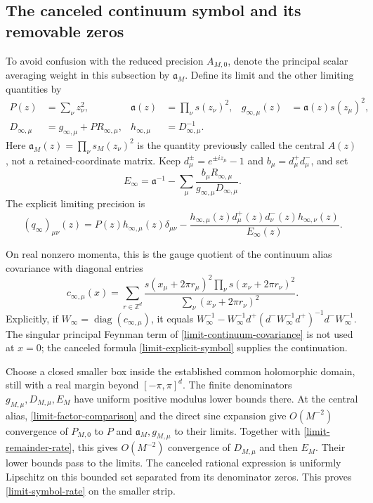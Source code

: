 \documentclass[11pt]{article}
\theoremstyle{remark}
\newcommand{\diag}{\operatorname{diag}}
\begin{document}
\subsection{The canceled continuum symbol and its removable zeros}

To avoid confusion with the reduced precision $A_{M,0}$, denote the
principal scalar averaging weight in this subsection by
$\mathfrak a_M$. Define its limit and the other limiting quantities by
\begin{align}
 P(z)&=\sum_\nu z_\nu^2,&
 \mathfrak a(z)&=\prod_\nu s(z_\nu)^2,&
 g_{\infty,\mu}(z)&=\mathfrak a(z)s(z_\mu)^2,
 \label{limit-central}\\
 D_{\infty,\mu}&=g_{\infty,\mu}+P R_{\infty,\mu},&
 h_{\infty,\mu}&=D_{\infty,\mu}^{-1}.&&
 \nonumber
\end{align}
Here $\mathfrak a_M(z)=\prod_\nu s_M(z_\nu)^2$ is the quantity
previously called the central $A(z)$, not a retained-coordinate matrix.
Keep $d_\mu^\pm=e^{\pm iz_\mu}-1$ and $b_\mu=d_\mu^+d_\mu^-$,
and set
\begin{equation}\label{limit-E}
 E_\infty=\mathfrak a^{-1}-\sum_\mu
 \frac{b_\mu R_{\infty,\mu}}
      {g_{\infty,\mu}D_{\infty,\mu}}.
\end{equation}
The explicit limiting precision is
\begin{equation}\label{limit-explicit-symbol}
 (q_\infty)_{\mu\nu}(z)
 =P(z)h_{\infty,\mu}(z)\delta_{\mu\nu}
 -\frac{h_{\infty,\mu}(z)d_\mu^+(z)d_\nu^-(z)
                  h_{\infty,\nu}(z)}{E_\infty(z)}.
\end{equation}

On real nonzero momenta, this is the gauge quotient of the continuum
alias covariance with diagonal entries
\begin{equation}\label{limit-continuum-covariance}
 c_{\infty,\mu}(x)=
 \sum_{r\in\mathbb Z^d}
 \frac{s(x_\mu+2\pi r_\mu)^2
               \prod_\nu s(x_\nu+2\pi r_\nu)^2}
      {\sum_\nu(x_\nu+2\pi r_\nu)^2}.
\end{equation}
Explicitly, if $W_\infty=\diag(c_{\infty,\mu})$, it equals
$W_\infty^{-1}-W_\infty^{-1}d^+
(d^-W_\infty^{-1}d^+)^{-1}d^-W_\infty^{-1}$.
The singular principal Feynman term of
\eqref{limit-continuum-covariance} is not used at $x=0$; the canceled
formula \eqref{limit-explicit-symbol} supplies the continuation.

Choose a closed smaller box inside the established common holomorphic
domain, still with a real margin beyond $[-\pi,\pi]^d$. The finite
denominators $g_{M,\mu},D_{M,\mu},E_M$ have uniform positive modulus
lower bounds there. At the central alias,
\eqref{limit-factor-comparison} and the direct sine expansion give
$O(M^{-2})$ convergence of $P_{M,0}$ to $P$ and
$\mathfrak a_M,g_{M,\mu}$ to their limits. Together with
\eqref{limit-remainder-rate}, this gives $O(M^{-2})$ convergence of
$D_{M,\mu}$ and then $E_M$. Their lower bounds pass to the limits.
The canceled rational expression is uniformly Lipschitz on this
bounded set separated from its denominator zeros. This proves
\eqref{limit-symbol-rate} on the smaller strip.
\end{document}

